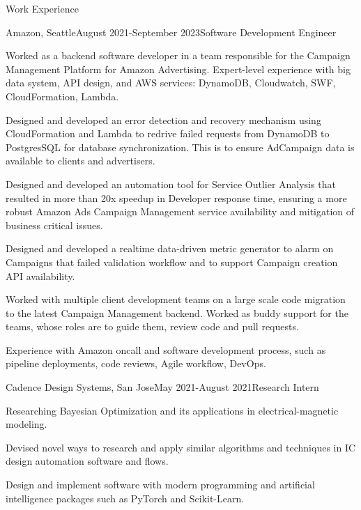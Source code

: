 \documentclass{resume} %
\begin{document}
\begin{rSection}{Work Experience}

\begin{rSubsection}{Amazon, Seattle}{August 2021-September 2023}{Software Development Engineer}{} 
    \item Worked as a backend software developer in a team responsible for the Campaign Management Platform for Amazon Advertising. Expert-level experience with big data system, API design, and AWS services: DynamoDB, Cloudwatch, SWF, CloudFormation, Lambda.
    
    \item Designed and developed an error detection and recovery mechanism using CloudFormation and Lambda to redrive failed requests from DynamoDB to PostgresSQL for database synchronization. This is to ensure AdCampaign data is available to clients and advertisers.
    
    \item Designed and developed an automation tool for Service Outlier Analysis that resulted in more than 20x speedup in Developer response time, ensuring a more robust Amazon Ads Campaign Management service availability and mitigation of business critical issues.
    
    \item Designed and developed a realtime data-driven metric generator to alarm on Campaigns that failed validation workflow and to support Campaign creation API availability.
    
    \item Worked with multiple client development teams on a large scale code migration to the latest Campaign Management backend. Worked as buddy support for the teams, whose roles are to guide them, review code and pull requests.
    
    \item Experience with Amazon oncall and software development process, such as pipeline deployments, code reviews, Agile workflow, DevOps. 
\end{rSubsection}

\begin{rSubsection}{Cadence Design Systems, San Jose}{May 2021-August 2021}{Research Intern}{} 
    \item Researching Bayesian Optimization and its applications in electrical-magnetic modeling. 
    \item Devised novel ways to research and apply similar algorithms and techniques in IC design automation software and flows. 
    \item Design and implement software with modern programming and artificial intelligence packages such as PyTorch and Scikit-Learn.
\end{rSubsection}


\end{rSection}
\end{document}
